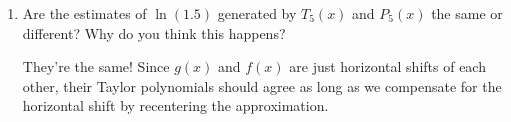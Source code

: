 \begin{enumerate}[leftmargin=0pt]
\begin{enumerate}
    \begin{red}
    Since $\ln(1.5) = g(1.5) \approx P_5(1.5)$, the estimate provided by $P_5(x)$ is $\ln(1.5) \approx P_5(1.5) = .40729166666\ldots$.
    \end{red}
    
    \item Are the estimates of $\ln(1.5)$ generated by $T_5(x)$ and $P_5(x)$ the same or different? Why do you think this happens?
    
    \begin{red}
    They're the same! Since $g(x)$ and $f(x)$ are just horizontal shifts of each other, their Taylor polynomials should agree as long as we compensate for the horizontal shift by recentering the approximation.
    \end{red}
\end{enumerate}

\end{enumerate}
